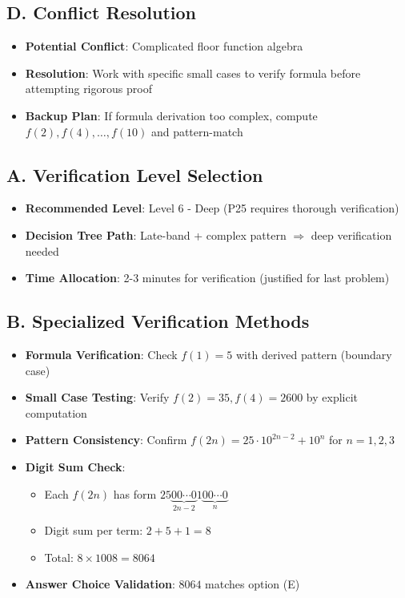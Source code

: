 \documentclass[]{article}
\begin{document}
\begin{techniquesbox}
\subsection*{D. Conflict Resolution}
\begin{itemize}[leftmargin=*]
    \item \textbf{Potential Conflict}: Complicated floor function algebra
    \item \textbf{Resolution}: Work with specific small cases to verify formula before attempting rigorous proof
    \item \textbf{Backup Plan}: If formula derivation too complex, compute $f(2), f(4), \ldots, f(10)$ and pattern-match
\end{itemize}
\end{techniquesbox}

\begin{verificationbox}
\subsection*{A. Verification Level Selection}
\begin{itemize}[leftmargin=*]
    \item \textbf{Recommended Level}: Level 6 - Deep (P25 requires thorough verification)
    \item \textbf{Decision Tree Path}: Late-band + complex pattern $\Rightarrow$ deep verification needed
    \item \textbf{Time Allocation}: 2-3 minutes for verification (justified for last problem)
\end{itemize}

\subsection*{B. Specialized Verification Methods}
\begin{itemize}[leftmargin=*]
    \item \textbf{Formula Verification}: Check $f(1) = 5$ with derived pattern (boundary case)
    \item \textbf{Small Case Testing}: Verify $f(2) = 35, f(4) = 2600$ by explicit computation
    \item \textbf{Pattern Consistency}: Confirm $f(2n) = 25 \cdot 10^{2n-2} + 10^n$ for $n=1,2,3$
    \item \textbf{Digit Sum Check}: 
    \begin{itemize}
        \item Each $f(2n)$ has form $25\underbrace{00\cdots0}_{2n-2}1\underbrace{00\cdots0}_{n}$
        \item Digit sum per term: $2 + 5 + 1 = 8$
        \item Total: $8 \times 1008 = 8064$
    \end{itemize}
    \item \textbf{Answer Choice Validation}: $8064$ matches option (E)
\end{itemize}


\end{verificationbox}
\end{document}
